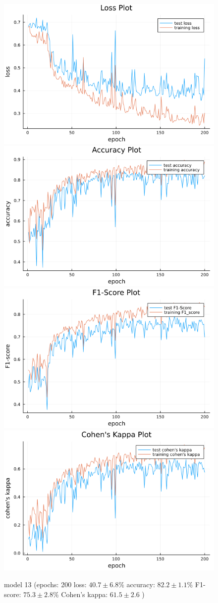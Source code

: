 \documentclass[
a4paper, 
12pt,
grayscalebody, %
abstract=on,
twoside, BCOR10mm, 12pt, DIV13,headinclude, footexclude, final, abstracton, openright
]{ibireprt}
\numberwithin{equation}{chapter}
\numberwithin{table}{chapter}
\numberwithin{figure}{chapter}
\numberwithin{algorithm}{chapter}
\numberwithin{example}{chapter}
\numberwithin{example}{chapter}
\begin{document}
\begin{figure}
	\includegraphics[width=0.4\linewidth]{loss_png_final_run_6_1.png}\hfill
	\includegraphics[width=0.4\linewidth]{accuracy_png_final_run_6_1.png}
	\\[\smallskipamount]
	\includegraphics[width=0.4\linewidth]{f1_score_png_final_run_6_1.png}\hfill
	\includegraphics[width=0.4\linewidth]{cohens_kappa_png_final_run_6_1.png}
	\caption{model 13 (epochs: 200 loss: $40.7\pm6.8\% $ accuracy: $82.2\pm1.1\%$ F1-score: $75.3\pm2.8\%$  Cohen's kappa: $61.5\pm2.6$ )}
	\label{fig:model_13_200}
\end{figure}
\end{document}
